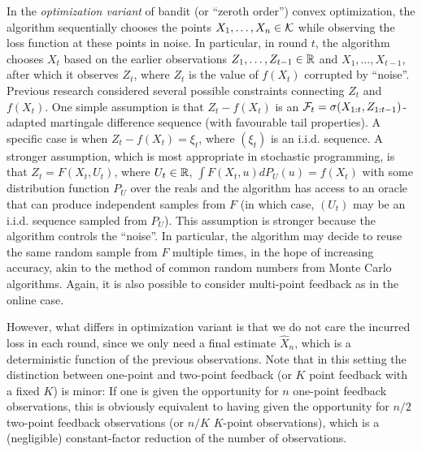 In the \emph{optimization variant} of bandit (or ``zeroth order'') convex optimization, 
the algorithm sequentially chooses the points $X_1,\dots,X_n\in \mathcal{K}$ while observing the loss function at these points in noise.
In particular, in round $t$, the algorithm chooses $X_t$ based on the earlier observations $Z_1,\dots,Z_{t-1}\in \mathbb{R}$ and $X_1,\dots,X_{t-1}$, after which it observes $Z_t$, where $Z_t$ is the value of $f(X_t)$ corrupted by ``noise''.
Previous research considered several possible constraints connecting $Z_t$ and $f(X_t)$.
One simple assumption is that $Z_t-f(X_t)$ is an $\mathcal{F}_t = \sigma(X_{1:t},Z_{1:t-1})$-adapted martingale difference sequence (with favourable tail properties). 
A specific case is when $Z_t - f(X_t) = \xi_t$, where $(\xi_t)$ is an i.i.d. sequence.
A stronger assumption, which is most appropriate in stochastic programming, 
is that $Z_t = F(X_t,U_t)$, where $U_t\in \mathbb{R}$, $\int F(X_t,u) dP_U(u) = f(X_t)$ with some distribution function $P_U$ over the reals and the algorithm has access to an oracle that can produce independent samples from $F$ (in which case, $(U_t)$ may be an i.i.d. sequence sampled from $P_U$).
This assumption is stronger because the algorithm controls the ``noise''. 
In particular, the algorithm may decide to reuse the same random sample from $F$ multiple times, 
in the hope of increasing accuracy, akin to the method of common random numbers from Monte Carlo algorithms.
Again, it is also possible to consider multi-point feedback as in the online case.

However, what differs in optimization variant is that we do not care the incurred loss in each round, since we only need a final estimate $\hat{X}_n$, which is a deterministic function of the previous observations.
Note that in this setting the distinction between one-point and two-point feedback (or $K$ point feedback with a fixed $K$) is minor: If one is given the opportunity for $n$ one-point feedback observations, this is obviously equivalent to having given the opportunity for $n/2$ two-point feedback observations (or $n/K$ $K$-point observations), which is a (negligible) constant-factor reduction of the number of observations.

